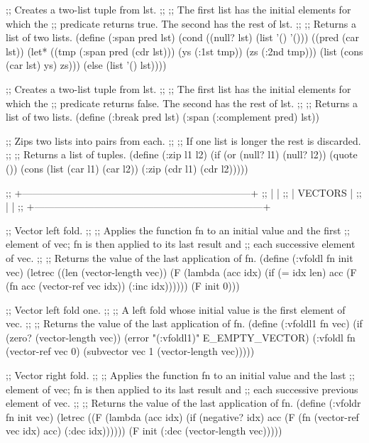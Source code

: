 ;; Creates a two-list tuple from lst.
;;
;; The first list has the initial elements for which the
;; predicate returns true. The second has the rest of lst.
;;
;; Returns a list of two lists.
(define (:span pred lst)
  (cond ((null? lst) 
           (list '() '()))
        ((pred (car lst))
           (let* ((tmp (:span pred (cdr lst)))
                  (ys (:1st tmp))
                  (zs (:2nd tmp)))
             (list (cons (car lst) ys) zs)))
        (else
           (list '() lst))))


;; Creates a two-list tuple from lst.
;;
;; The first list has the initial elements for which the
;; predicate returns false. The second has the rest of lst.
;;
;; Returns a list of two lists.
(define (:break pred lst)
  (:span (:complement pred) lst))


;; Zips two lists into pairs from each.
;;
;; If one list is longer the rest is discarded.
;;
;; Returns a list of tuples.
(define (:zip l1 l2)
  (if (or (null? l1) (null? l2))
    (quote ())
    (cons (list (car l1) (car l2)) 
          (:zip (cdr l1) (cdr l2)))))


;; +---------------------------------------------------------------------+
;; |                                                                     |
;; |                               VECTORS                               |
;; |                                                                     |
;; +---------------------------------------------------------------------+


;; Vector left fold.
;;
;; Applies the function fn to an initial value and the first
;; element of vec; fn is then applied to its last result and
;; each successive element of vec.
;;
;; Returns the value of the last application of fn.
(define (:vfoldl fn init vec)
  (letrec ((len (vector-length vec))
           (F (lambda (acc idx)
                (if (= idx len)
                  acc
                  (F (fn acc (vector-ref vec idx)) (:inc idx))))))
    (F init 0)))


;; Vector left fold one.
;;
;; A left fold whose initial value is the first element of vec.
;;
;; Returns the value of the last application of fn.
(define (:vfoldl1 fn vec)
  (if (zero? (vector-length vec))
    (error "(:vfoldl1)" E_EMPTY_VECTOR)
    (:vfoldl fn (vector-ref vec 0) (subvector vec 1 (vector-length vec)))))


;; Vector right fold.
;;
;; Applies the function fn to an initial value and the last
;; element of vec; fn is then applied to its last result and 
;; each successive previous element of vec.
;;
;; Returns the value of the last application of fn.
(define (:vfoldr fn init vec)
  (letrec ((F (lambda (acc idx)
                (if (negative? idx)
                  acc
                  (F (fn (vector-ref vec idx) acc) (:dec idx))))))
    (F init (:dec (vector-length vec)))))


